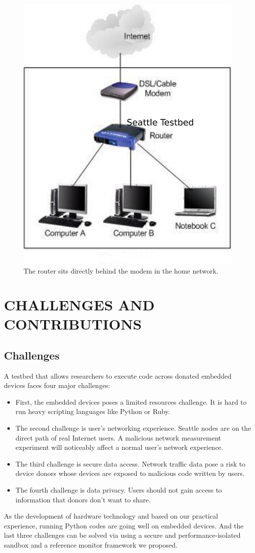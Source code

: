 \documentclass[conference]{IEEEtran}   	%
\begin{document}
\begin{figure}%
\centering
\includegraphics[width=0.5\columnwidth]{home-network.jpg}
\caption{The router sits directly behind the modem in the home network.}
\label{figure:design}
\end{figure}

\section{CHALLENGES AND CONTRIBUTIONS}
\label{sec.design}
\subsection{Challenges}
A testbed that allows researchers to execute code across donated embedded devices faces four major challenges: 
\begin{itemize}
\item First, the embedded devices poses a limited resources challenge. It is hard to run heavy scripting languages like Python or Ruby. 
\item The second challenge is user's networking experience. Seattle nodes are on the direct path of real Internet users. A malicious network measurement experiment will noticeably affect a normal user's network experience. 
\item The third challenge is secure data access. Network traffic data pose a risk to device donors whose devices are exposed to malicious code written by users. 
\item The fourth challenge is data privacy. Users should not gain access to information that donors don't want to share.
\end{itemize}
As the development of hardware technology and based on our practical experience, running Python codes are going well on embedded devices. And the last three challenges can be solved via using a secure and performance-isolated sandbox and a reference monitor framework we proposed.
\end{document}
